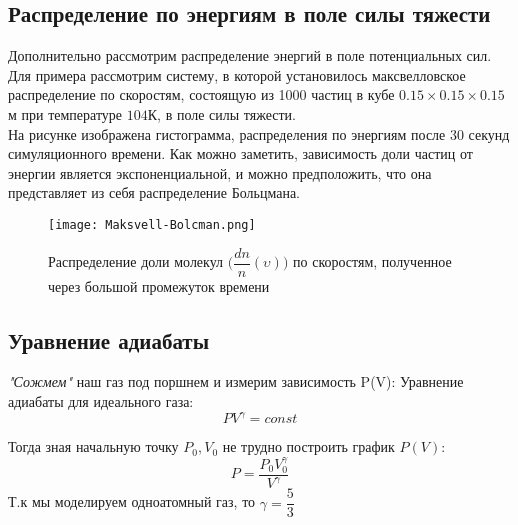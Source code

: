 \documentclass[twoside,twocolumn]{article}
\theoremstyle{plain}
\theoremstyle{definition}
\begin{document}
\subsection{Распределение по энергиям в поле силы тяжести}

Дополнительно рассмотрим распределение энергий в поле потенциальных сил. Для примера рассмотрим систему, в которой установилось максвелловское распределение по скоростям, состоящую из 1000 частиц в кубе $0.15 \times 0.15 \times 0.15$м при температуре $104$К, в поле силы тяжести.\\
\indent На рисунке изображена гистограмма, распределения по энергиям после 30 секунд симуляционного времени. Как можно заметить, зависимость доли частиц от энергии является экспоненциальной, и можно предположить, что она представляет из себя распределение Больцмана.

\begin{figure}[!h]
{\texttt{[image: Maksvell-Bolcman.png]}}
\caption{Распределение доли молекул $\Big(\dfrac{dn}{n} (\upsilon) \Big)$ по скоростям, полученное через большой промежуток времени}
\end{figure}

\begin{comment}
\subsection{Определение зависимости распределения скоростей от времени. Чтобы понять через какое время устанавливается распределение Максвелла \textbf{[В разработке]}}
\begin{Large}

\begin{center}
\textbf{В разработке}
\end{center}

\end{Large}

\end{comment}

\subsection{Уравнение адиабаты}
\textit{"Сожмем"} наш газ под поршнем и измерим зависимость P(V):
Уравнение адиабаты для идеального газа:
\[PV^\gamma = const \]

Тогда зная начальную точку $P_0, V_0$ не трудно построить график $P(V)$:
\[P = \dfrac{P_0 V_0^\gamma}{V ^\gamma} \]
Т.к мы моделируем одноатомный газ, то $\gamma = \dfrac{5}{3}$
\end{document}
